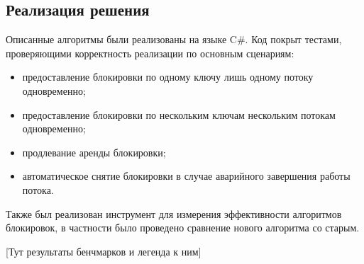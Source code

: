 \subsection{Реализация решения}

Описанные алгоритмы были реализованы на языке C\#. Код покрыт тестами, проверяющими корректность реализации по основным сценариям:
\begin{itemize}
	\item предоставление блокировки по одному ключу лишь одному потоку одновременно;
	\item предоставление блокировки по нескольким ключам нескольким потокам одновременно;
	\item продлевание аренды блокировки;
	\item автоматическое снятие блокировки в случае аварийного завершения работы потока.
\end{itemize}

Также был реализован инструмент для измерения эффективности алгоритмов блокировок, в частности было проведено сравнение нового алгоритма со старым.

[Тут результаты бенчмарков и легенда к ним]